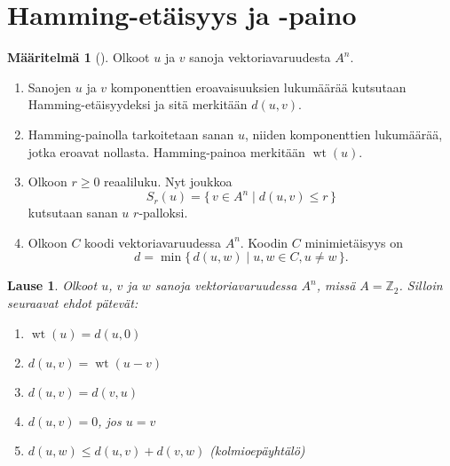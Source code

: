 \documentclass[a4paper,12pt,leqno,oneside]{report} %
\theoremstyle{plain}
\newtheorem{lause}{Lause}[chapter]
\theoremstyle{definition}
\newtheorem{maaritelma}{Määritelmä}[chapter]
\DeclareMathOperator{\wt}{wt}
\theoremstyle{remark}
\numberwithin{equation}{chapter}
\newcommand*{\Zset}{\mathbb{Z}}  %
\begin{document}
    \section{Hamming-etäisyys ja -paino}
    \begin{maaritelma}[{\cite[s.~492]{PA}}]\label{maar:perus}
        Olkoot $u$ ja $v$ sanoja vektoriavaruudesta $A^n$.
        \begin{enumerate}
            \item\label{kht:etaisyys} Sanojen $u$ ja $v$ komponenttien eroavaisuuksien lukumäärää kutsutaan \break{} Hamming-etäisyydeksi ja sitä merkitään $d(u,v)$.
            \item\label{kht:paino} Hamming-painolla tarkoitetaan sanan $u$, niiden komponenttien lukumäärää, jotka eroavat nollasta. Hamming-painoa merkitään
                $\wt(u)$.
            \item Olkoon $r\ge0$ reaaliluku. Nyt joukkoa
                \[
                    S_r(u) = \{\,v \in A^n \mid d(u, v) \le r \,\}
                \]
                kutsutaan sanan $u$ $r$-palloksi.
            \item Olkoon $C$ koodi vektoriavaruudessa $A^n$. Koodin $C$ minimietäisyys on
                \[
                    d = \min\{\, d(u, w) \mid u, w \in C, u \neq w \,\}.
                \]
        \end{enumerate}
    \end{maaritelma}

    \begin{lause}\label{lause:Hamming}
        Olkoot $u$, $v$ ja $w$ sanoja vektoriavaruudessa $A^n$, missä $A = \Zset_2$. Silloin seuraavat ehdot pätevät:
        \begin{enumerate}
            \item\label{kht:painoetaisyys} $\wt(u) = d(u, 0)$
            \item\label{kht:etaisyyspaino} $d(u, v) = \wt(u - v)$
            \item\label{kht:vaihdannaisuus}$d(u, v) = d(v, u)$
            \item\label{kht:nollaetaisyys} $d(u, v) = 0$, jos $u = v$
            \item\label{kht:kolmioey} $d(u, w) \le d(u, v) + d(v, w)$ \quad (kolmioepäyhtälö)
        \end{enumerate}
    \end{lause}
\end{document}
